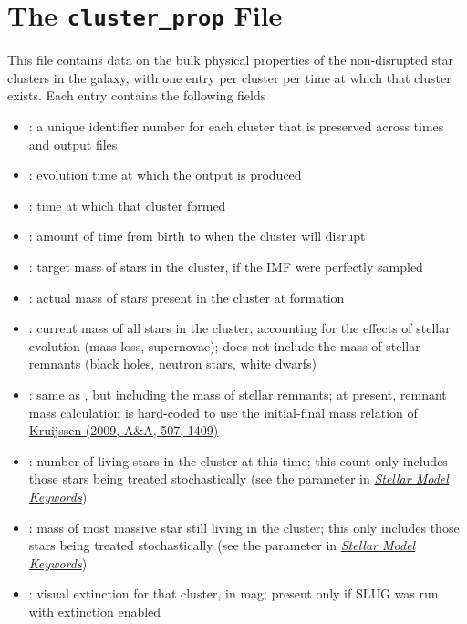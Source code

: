 \documentclass[letterpaper,10pt,english]{sphinxmanual}
\begin{document}
\section{The \texttt{cluster\_prop} File}
\label{output:the-cluster-prop-file}
This file contains data on the bulk physical properties of the non-disrupted star clusters in the galaxy, with one entry per cluster per time at which that cluster exists. Each entry contains the following fields
\begin{itemize}
\item {} 
: a unique identifier number for each cluster that is preserved across times and output files

\item {} 
: evolution time at which the output is produced

\item {} 
: time at which that cluster formed

\item {} 
: amount of time from birth to when the cluster will disrupt

\item {} 
: target mass of stars in the cluster, if the IMF were perfectly sampled

\item {} 
: actual mass of stars present in the cluster at formation

\item {} 
: current mass of all stars in the cluster, accounting for the effects of stellar evolution (mass loss, supernovae); does not include the mass of stellar remnants (black holes, neutron stars, white dwarfs)

\item {} 
: same as , but including the mass of stellar remnants; at present, remnant mass calculation is hard-coded to use the initial-final mass relation of \href{http://adsabs.harvard.edu/abs/2009A\%26A...507.1409K}{Kruijssen (2009, A\&A, 507, 1409)}

\item {} 
: number of living stars in the cluster at this time; this count only includes those stars being treated stochastically (see the parameter  in {\hyperref[parameters:ssec-stellar-keywords]{\emph{Stellar Model Keywords}}})

\item {} 
: mass of most massive star still living in the cluster; this only includes those stars being treated stochastically (see the parameter  in {\hyperref[parameters:ssec-stellar-keywords]{\emph{Stellar Model Keywords}}})

\item {} 
: visual extinction for that cluster, in mag; present only if SLUG was run with extinction enabled

\end{itemize}
\end{document}
